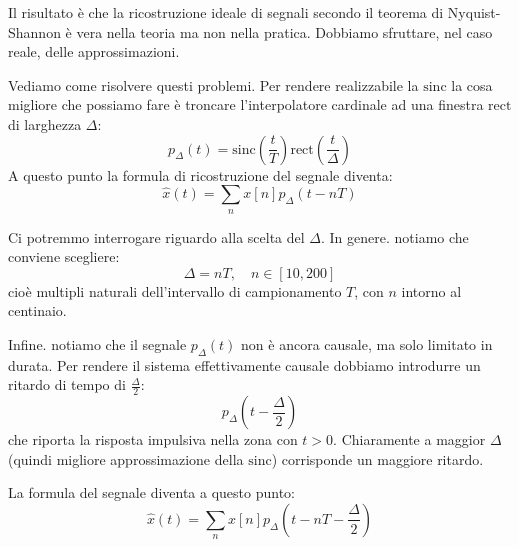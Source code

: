 \documentclass[a4paper,11pt]{article}
\begin{document}
Il risultato è che la ricostruzione ideale di segnali secondo il teorema di Nyquist-Shannon è vera nella teoria ma non nella pratica. Dobbiamo sfruttare, nel caso reale, delle approssimazioni.

\par\smallskip

Vediamo come risolvere questi problemi. Per rendere realizzabile la $\mathrm{sinc}$ la cosa migliore che possiamo fare è troncare l'interpolatore cardinale ad una finestra $\mathrm{rect}$ di larghezza $\Delta$:
$$
p_\Delta (t) = \mathrm{sinc} \left( \frac{t}{T} \right) \mathrm{rect} \left( \frac{t}{\Delta} \right)  
$$
A questo punto la formula di ricostruzione del segnale diventa:
$$
\hat{x}(t) = \sum_n x[n] p_\Delta (t - nT)
$$

Ci potremmo interrogare riguardo alla scelta del $\Delta$. In genere. notiamo che conviene scegliere:
$$
\Delta = n T, \quad n \in [10, 200]
$$
cioè multipli naturali dell'intervallo di campionamento $T$, con $n$ intorno al centinaio.

Infine. notiamo che il segnale $p_\Delta(t)$ non è ancora causale, ma solo limitato in durata. Per rendere il sistema effettivamente causale dobbiamo introdurre un ritardo di tempo di $\frac{\Delta}{2}$:
$$
p_\Delta(t - \frac{\Delta}{2})
$$
che riporta la risposta impulsiva nella zona con $t > 0$. Chiaramente a maggior $\Delta$ (quindi migliore approssimazione della $\mathrm{sinc}$) corrisponde un maggiore ritardo.

La formula del segnale diventa a questo punto:
$$
\hat{x} (t) = \sum_n x[n] p_\Delta (t - nT - \frac{\Delta}{2})
$$
\end{document}

